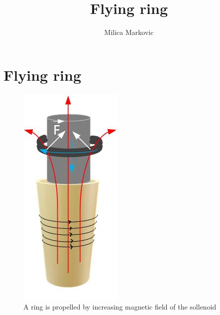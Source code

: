 \documentclass{ximera}
\title{Flying ring}
\author{Milica Markovic}
\begin{document}
  
\begin{abstract}  

\end{abstract}  
\maketitle    


\section{Flying ring}





\begin{figure}[htbp]
\begin{center}
\includegraphics[scale=1]{../jpg/flyingRing.jpg}
\end{center}
\caption{A ring is propelled by increasing magnetic field of the sollenoid}
\label{fig:flyingRing}
\end{figure}
\end{document}
